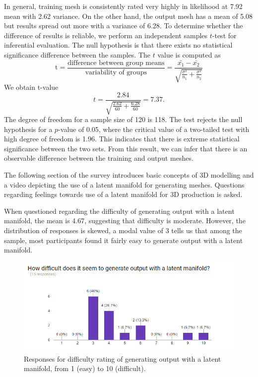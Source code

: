 \documentclass[ %
author={Dillon Keith Diep},
supervisor={Dr. Carl Henrik Ek},
degree={MEng},
title={ART-CG:},
subtitle={Assisted Real-time Content Generation of 3D Hair by Learning Manifolds},
type={Research},
year={2017} ]{dissertation}
\begin{document}
In general, training mesh is consistently rated very highly in likelihood at 7.92 mean with 2.62 variance. On the other hand, the output mesh has a mean of 5.08 but results spread out more with a variance of 6.28. To determine whether the difference of results is reliable, we perform an independent samples $t$-test for inferential evaluation. The null hypothesis is that there exists no statistical significance difference between the samples. The $t$ value is computed as
$$\text{t}=\frac{\text{difference between group means}}{\text{variability of groups}}=\frac{\bar{x_1}-\bar{x_2}}{\sqrt{\frac{\sigma^2}{n_1}+\frac{\sigma^2}{n_2}}}$$
We obtain t-value
$$t = \frac{2.84}{\sqrt{\frac{2.62}{60}+\frac{6.28}{60}}}=7.37.$$
The degree of freedom for a sample size of 120 is 118. The test rejects the null hypothesis for a $p$-value of 0.05, where the critical value of a two-tailed test with high degree of freedom is 1.96. This indicates that there is extreme statistical significance between the two sets. From this result, we can infer that there is an observable difference between the training and output meshes.

The following section of the survey introduces basic concepts of 3D modelling and a video depicting the use of a latent manifold for generating meshes. Questions regarding feelings towards use of a latent manifold for 3D production is asked.

When questioned regarding the difficulty of generating output with a latent manifold, the mean is 4.67, suggesting that difficulty is moderate. However, the distribution of responses is skewed, a modal value of 3 tells us that among the sample, most participants found it fairly easy to generate output with a latent manifold.
\begin{figure}[!h]
	\centering
	\caption{Responses for difficulty rating of generating output with a latent manifold, from 1 (easy) to 10 (difficult).}
	\includegraphics[scale=0.7]{images/surveyDifficulty}
\end{figure}
\end{document}
